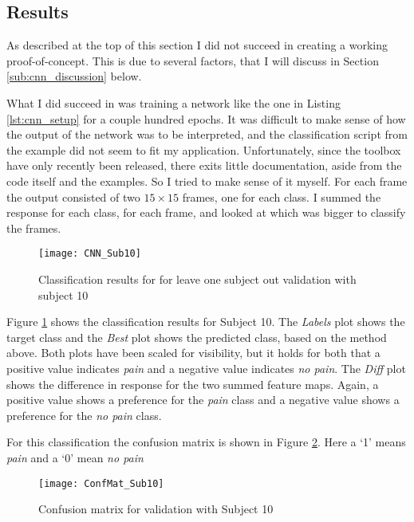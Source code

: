 \documentclass[Main]{subfiles}
\begin{document}
	\subsection{Results} %
		\label{sub:cnn_results}
		As described at the top of this section I did not succeed in creating a working proof-of-concept.
		This is due to several factors, that I will discuss in Section \ref{sub:cnn_discussion} below.

		What I did succeed in was training a network like the one in Listing \ref{lst:cnn_setup} for a couple hundred epochs.
		It was difficult to make sense of how the output of the network was to be interpreted, and the classification script from the example did not seem to fit my application.
		Unfortunately, since the toolbox have only recently been released, there exits little documentation, aside from the code itself and the examples.
		So I tried to make sense of it myself.
		For each frame the output consisted of two $15\times15$ frames, one for each class.
		I summed the response for each class, for each frame, and looked at which was bigger to classify the frames.

		\begin{figure}[H]
			\begin{center}
				\texttt{[image: CNN\_Sub10]}
			\end{center}
			\caption{Classification results for for leave one subject out validation with subject 10}
			\label{fig:Results_sub10}
		\end{figure}

		Figure \ref{fig:Results_sub10} shows the classification results for Subject 10.
		The \emph{Labels} plot shows the target class and the \emph{Best} plot shows the predicted class, based on the method above.
		Both plots have been scaled for visibility, but it holds for both that a positive value indicates \emph{pain} and a negative value indicates \emph{no pain}.
		The \emph{Diff} plot shows the difference in response for the two summed feature maps.
		Again, a positive value shows a preference for the \emph{pain} class and a negative value shows a preference for the \emph{no pain} class.

		For this classification the confusion matrix is shown in Figure \ref{fig:cnn_conf10}. Here a `1' means \emph{pain} and a `0' mean \emph{no pain}

		\begin{figure}[H]
			\begin{center}
				\texttt{[image: ConfMat\_Sub10]}
			\end{center}
			\caption{Confusion matrix for validation with Subject 10}
			\label{fig:cnn_conf10}
		\end{figure}
\end{document}
